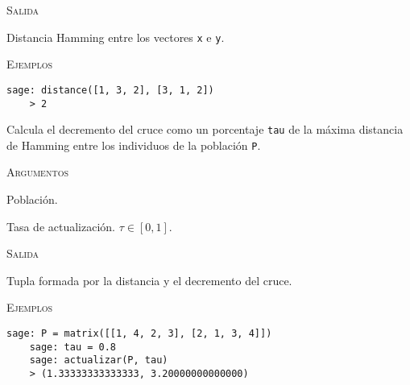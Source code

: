 \begin{description}[leftmargin=1em, font=\normalfont\ttfamily, style=nextline]
  \textsc{Salida}
  \begin{description}[font=\normalfont\ttfamily]
    \item[] Distancia Hamming entre los vectores \texttt{x} e \texttt{y}.
  \end{description}

  \textsc{Ejemplos}
  \begin{lstlisting}[gobble=4]
    sage: distance([1, 3, 2], [3, 1, 2])
    > 2
  \end{lstlisting}

  \item[actualizar(P, tau)] Calcula el decremento del cruce como un porcentaje \texttt{tau} de la máxima distancia de Hamming entre los individuos de la población \texttt{P}.

  \textsc{Argumentos}
  \begin{description}[font=\normalfont\ttfamily]
    \item[P] Población.
    \item[tau] Tasa de actualización. $\tau \in [0,1]$.
  \end{description}

  \textsc{Salida}
  \begin{description}[font=\normalfont\ttfamily]
    \item[] Tupla formada por la distancia y el decremento del cruce.
  \end{description}

  \textsc{Ejemplos}
  \begin{lstlisting}[gobble=4]
    sage: P = matrix([[1, 4, 2, 3], [2, 1, 3, 4]])
    sage: tau = 0.8
    sage: actualizar(P, tau)
    > (1.33333333333333, 3.20000000000000)
  \end{lstlisting}
\end{description}
